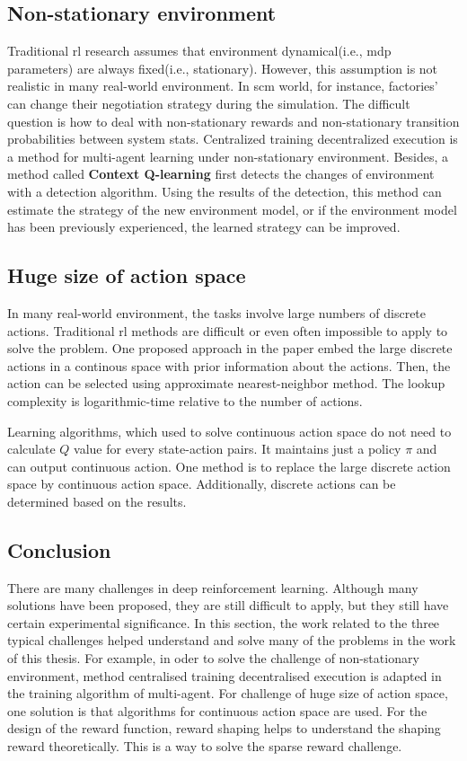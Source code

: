 \subsection{Non-stationary environment}
Traditional \gls{rl} research assumes that environment dynamical(i.e., \gls{mdp} parameters) are always fixed(i.e., stationary). However, this assumption is not realistic in many real-world environment. In \gls{scm} world, for instance, factories' can change their negotiation strategy during the simulation. The difficult question is how to deal with non-stationary rewards and non-stationary transition probabilities between system stats. Centralized training decentralized execution\parencite{maddpg2017} is a method for multi-agent learning under non-stationary environment. Besides, a method called \textbf{Context Q-learning}\parencite{Padakandla_2020} first detects the changes of environment with a detection algorithm. Using the results of the detection, this method can estimate the strategy of the new environment model, or if the environment model has been previously experienced, the learned strategy can be improved.

\subsection{Huge size of action space}
In many real-world environment, the tasks involve large numbers of discrete actions. Traditional \gls{rl} methods are difficult or even often impossible to apply to solve the problem. One proposed approach in the paper \parencite{dulacarnold2016deep} embed the large discrete actions in a continous space with prior information about the actions. Then, the action can be selected using approximate nearest-neighbor method. The lookup complexity is logarithmic-time relative to the number of actions.

Learning algorithms, which used to solve continuous action space do not need to calculate $Q$ value for every state-action pairs. It maintains just a policy $\pi$ and can output continuous action. One method is to replace the large discrete action space by continuous action space. Additionally, discrete actions can be determined based on the results.

\subsection{Conclusion}
There are many challenges in deep reinforcement learning. Although many solutions have been proposed, they are still difficult to apply, but they still have certain experimental significance. In this section, the work related to the three typical challenges helped understand and solve many of the problems in the work of this thesis. For example, in oder to solve the challenge of non-stationary environment, method centralised training decentralised execution is adapted in the training algorithm of multi-agent. For challenge of huge size of action space, one solution is that algorithms for continuous action space are used. For the design of the reward function, reward shaping helps to understand the shaping reward theoretically. This is a way to solve the sparse reward challenge. 